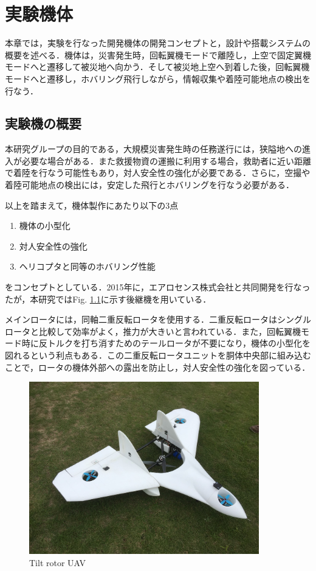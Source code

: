 
\chapter{実験機体}
\label{aircraft}

本章では，実験を行なった開発機体の開発コンセプトと，設計や搭載システムの概要を述べる．機体は，災害発生時，回転翼機モードで離陸し，上空で固定翼機モードへと遷移して被災地へ向かう．そして被災地上空へ到着した後，回転翼機モードへと遷移し，ホバリング飛行しながら，情報収集や着陸可能地点の検出を行なう．

\section{実験機の概要}
本研究グループの目的である，大規模災害発生時の任務遂行には，狭隘地への進入が必要な場合がある．また救援物資の運搬に利用する場合，救助者に近い距離で着陸を行なう可能性もあり，対人安全性の強化が必要である．さらに，空撮や着陸可能地点の検出には，安定した飛行とホバリングを行なう必要がある．

以上を踏まえて，機体製作にあたり以下の3点
	\begin{enumerate}
	\item 機体の小型化
	\item 対人安全性の強化
	\item ヘリコプタと同等のホバリング性能
	\end{enumerate}
をコンセプトとしている．2015年に，エアロセンス株式会社と共同開発を行なったが，本研究ではFig. \ref{fig:vtol23k}に示す後継機を用いている．

\hspace{5pt}

メインロータには，同軸二重反転ロータを使用する．二重反転ロータはシングルロータと比較して効率がよく，推力が大きいと言われている．また，回転翼機モード時に反トルクを打ち消すためのテールロータが不要になり，機体の小型化を図れるという利点もある．この二重反転ロータユニットを胴体中央部に組み込むことで，ロータの機体外部への露出を防止し，対人安全性の強化を図っている．

\begin{figure}[H]
	\centering
	\includegraphics[clip,width=10.0cm,bb=0 0 1478 1108]{./z_figure_files/chapter2/1_vtol23K.JPG}
	\caption{Tilt rotor UAV}
	\label{fig:vtol23k}
\end{figure}

